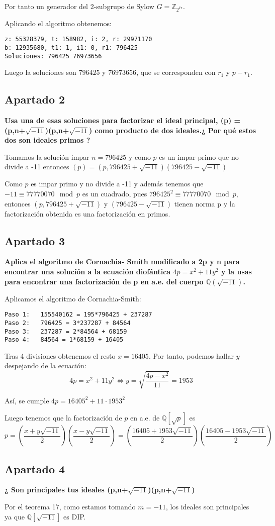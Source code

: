 \documentclass[a4paper]{article}
\begin{document}
Por tanto un generador del 2-subgrupo de Sylow $G=\mathbb{Z}_{2^{17}}$.

Aplicando el algoritmo obtenemos:

\begin{verbatim}
z: 55328379, t: 158982, i: 2, r: 29971170
b: 12935680, t1: 1, i1: 0, r1: 796425
Soluciones: 796425 76973656
\end{verbatim}

Luego la soluciones son $796425$ y $76973656$, que se corresponden con $r_1$ y $p-r_1$.

\subsection{Apartado 2}
\textbf{Usa una de esas soluciones para factorizar el ideal principal, (p) =(p,n+$\sqrt{-11}$)(p,n+$\sqrt{-11}$) como producto de dos ideales.¿ Por qué estos dos son ideales primos ?}

Tomamos la solución impar $n=796425$ y como $p$ es un impar primo que no divide a -11 entonces $(p)=\left(p, 796425+\sqrt{-11}\right)\left(796425-\sqrt{-11}\right)$

Como $p$ es impar primo y no divide a -11 y además tenemos que $-11\equiv 77770070 \mod p$ es un cuadrado, pues $796425^2\equiv 77770070 \mod p$, entonces $\left(p, 796425+\sqrt{-11}\right)$ y $\left(796425-\sqrt{-11}\right)$ tienen norma p y la factorización obtenida es una factorización en primos.

\subsection{Apartado 3}
\textbf{Aplica el algoritmo de Cornachia- Smith modificado a 2p y n para encontrar una solucíón a la ecuación diofántica $4p =x^2 + 11y^2$ y la usas para encontrar una factorización de p en a.e. del cuerpo $\mathbb{Q}(\sqrt{-11})$.}

Aplicamos el algoritmo de Cornachia-Smith:

\begin{verbatim}
Paso 1:   155540162 = 195*796425 + 237287
Paso 2:   796425 = 3*237287 + 84564
Paso 3:   237287 = 2*84564 + 68159
Paso 4:   84564 = 1*68159 + 16405
\end{verbatim}

Tras 4 divisiones obtenemos el resto $x=16405$. Por tanto, podemos hallar $y$ despejando de la ecuación:
$$4p =x^2 + 11y^2  \Leftrightarrow y = \sqrt{\frac{4p-x^2}{11}}=1953$$

Así, se cumple  $4p = 16405^2+11\cdot 1953^2$

Luego tenemos que la factorización de $p$ en a.e. de $\mathbb{Q}[\sqrt{p}]$ es
$$p= \left( \frac{x+y\sqrt{-11}}{2}\right) \left( \frac{x-y\sqrt{-11}}{2}\right) = \left( \frac{16405+1953\sqrt{-11}}{2}\right) \left( \frac{16405-1953\sqrt{-11}}{2}\right)$$


\subsection{Apartado 4}
\textbf{¿ Son principales tus ideales (p,n+$\sqrt{-11}$)(p,n+$\sqrt{-11}$)}

Por el teorema 17, como estamos tomando $m=-11$, los ideales son principales ya que $\mathbb{Q}[\sqrt{-11}]$ es DIP.
\end{document}
